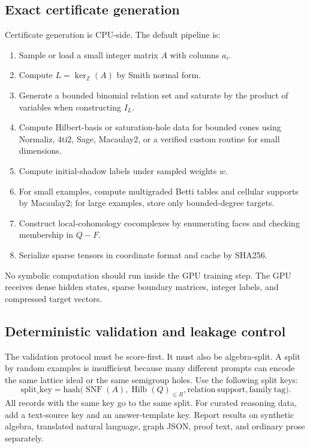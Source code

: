 \documentclass[11pt]{article}
\theoremstyle{definition}
\newcommand{\ZZ}{\mathbb{Z}}
\begin{document}
\subsection{Exact certificate generation}
Certificate generation is CPU-side.  The default pipeline is:
\begin{enumerate}[leftmargin=*]
\item Sample or load a small integer matrix \(A\) with columns \(a_i\).
\item Compute \(L=\ker_\ZZ(A)\) by Smith normal form.
\item Generate a bounded binomial relation set and saturate by the product of variables when constructing \(I_L\).
\item Compute Hilbert-basis or saturation-hole data for bounded cones using Normaliz, 4ti2, Sage, Macaulay2, or a verified custom routine for small dimensions.
\item Compute initial-shadow labels under sampled weights \(w\).
\item For small examples, compute multigraded Betti tables and cellular supports by Macaulay2; for large examples, store only bounded-degree targets.
\item Construct local-cohomology cocomplexes by enumerating faces and checking membership in \(Q-F\).
\item Serialize sparse tensors in coordinate format and cache by SHA256.
\end{enumerate}
No symbolic computation should run inside the GPU training step.  The GPU receives dense hidden states, sparse boundary matrices, integer labels, and compressed target vectors.

\subsection{Deterministic validation and leakage control}
The validation protocol must be score-first.  It must also be algebra-split.  A split by random examples is insufficient because many different prompts can encode the same lattice ideal or the same semigroup holes.  Use the following split keys:
\[
\mathrm{split\_key}=\mathrm{hash}\big(\operatorname{SNF}(A),\operatorname{Hilb}(Q)_{\le R},\mathrm{relation\ support},\mathrm{family\ tag}\big).
\]
All records with the same key go to the same split.  For curated reasoning data, add a text-source key and an answer-template key.  Report results on synthetic algebra, translated natural language, graph JSON, proof text, and ordinary prose separately.
\end{document}
